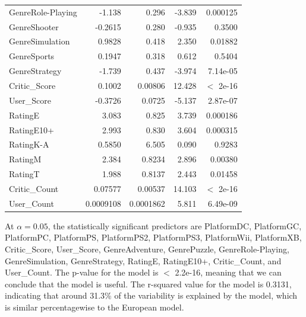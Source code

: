 \documentclass[12pt]{article}
\begin{document}
\begin{table}[ht]
\begin{tabular}{lrrrr}
    GenreRole-Playing & -1.138 & 0.296 & -3.839 & 0.000125 \\
    GenreShooter & -0.2615 & 0.280 & -0.935 & 0.3500 \\
    GenreSimulation & 0.9828 & 0.418 & 2.350 & 0.01882 \\
    GenreSports & 0.1947 & 0.318 & 0.612 & 0.5404 \\
    GenreStrategy & -1.739 & 0.437 & -3.974 & 7.14e-05 \\
    Critic\_Score & 0.1002 & 0.00806 & 12.428 & $<$ 2e-16 \\
    User\_Score & -0.3726 & 0.0725 & -5.137 & 2.87e-07 \\
    RatingE & 3.083 & 0.825 & 3.739 & 0.000186 \\
    RatingE10+ & 2.993 & 0.830 & 3.604 & 0.000315 \\
    RatingK-A & 0.5850 & 6.505 & 0.090 & 0.9283 \\
    RatingM & 2.384 & 0.8234 & 2.896 & 0.00380 \\
    RatingT & 1.988 & 0.8137 & 2.443 & 0.01458 \\
    Critic\_Count & 0.07577 & 0.00537 & 14.103 & $<$ 2e-16 \\
    User\_Count & 0.0009108 & 0.0001862 & 5.811 & 6.49e-09 \\
    \hline
  \end{tabular}
\end{table}

At $\alpha=0.05$, the statistically significant predictors are PlatformDC, PlatformGC, PlatformPC, PlatformPS, PlatformPS2, 
PlatformPS3, PlatformWii, PlatformXB, Critic_Score, User_Score, GenreAdventure, GenrePuzzle, GenreRole-Playing, GenreSimulation, 
GenreStrategy, RatingE, RatingE10+, Critic_Count, and User_Count.
The p-value for the model is $<$ 2.2e-16, meaning that we can conclude that the model is useful. The r-squared value for the model is 0.3131,
indicating that around 31.3\% of the variability is explained by the model, which is similar percentagewise to the European model.
\end{document}
